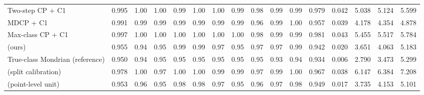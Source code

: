 \begin{table}[!htbp]
{\begin{tabular}{lccccccccccccccc}
Two-step CP + C1 & 0.995 & 1.00 & 1.00 & 0.99 & 1.00 & 1.00 & 0.99 & 0.98 & 0.99 & 0.99 & 0.979 & 0.042 & 5.038 & 5.124 & 5.599 \\
MDCP + C1 & 0.991 & 0.99 & 0.99 & 0.99 & 0.99 & 0.99 & 0.99 & 0.96 & 0.99 & 1.00 & 0.957 & 0.039 & 4.178 & 4.354 & 4.878 \\
Max-class CP + C1 & 0.997 & 1.00 & 1.00 & 1.00 & 1.00 & 1.00 & 1.00 & 0.98 & 0.99 & 0.99 & 0.981 & 0.043 & 5.455 & 5.517 & 5.784 \\
\gamut{} (ours) & 0.955 & 0.94 & 0.95 & 0.99 & 0.99 & 0.97 & 0.95 & 0.97 & 0.97 & 0.99 & 0.942 & 0.020 & 3.651 & 4.063 & 5.183 \\
True-class Mondrian (reference) & 0.950 & 0.94 & 0.95 & 0.95 & 0.95 & 0.95 & 0.95 & 0.95 & 0.93 & 0.94 & 0.934 & 0.006 & 2.790 & 3.473 & 5.299 \\
\gamut{} (split calibration) & 0.978 & 1.00 & 0.97 & 1.00 & 1.00 & 0.99 & 0.99 & 0.97 & 0.99 & 1.00 & 0.967 & 0.038 & 6.147 & 6.384 & 7.208 \\
\gamut{} (point-level unit) & 0.953 & 0.96 & 0.95 & 0.98 & 0.98 & 0.97 & 0.95 & 0.96 & 0.97 & 0.98 & 0.949 & 0.017 & 3.735 & 4.153 & 5.101 \\
\bottomrule
\end{tabular}}
\end{table}
\FloatBarrier

